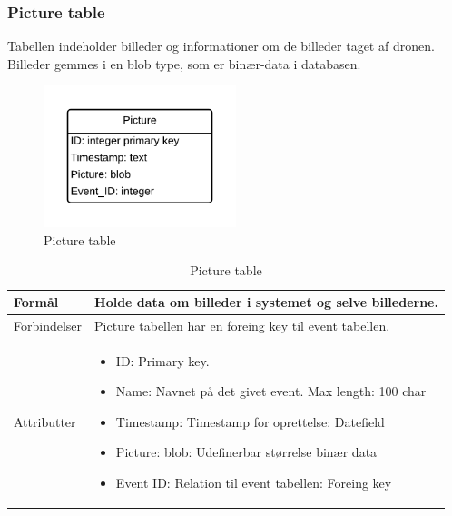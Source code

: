 \subsubsection*{Picture table}
Tabellen indeholder billeder og informationer om de billeder taget af dronen. Billeder gemmes i en blob type, som er binær-data i databasen.
\vspace{-5pt}
\begin{figure}[H]
	\centering
	\includegraphics[width=0.5\textwidth]{Billeder/database/PictureTable.png}
	\vspace{-5pt}
	\caption{Picture table}
	\label{fig:picture_table}
\end{figure}

\begin{table}[H]
\begin{tabular}{| p{3cm}| p{11.5cm}|}
\hline

Formål	 							& Holde data om billeder i systemet og selve billederne.\\\hline
Forbindelser						& Picture tabellen har en foreing key til event tabellen.\\\hline
Attributter						& \begin{itemize}
												\item ID: Primary key.
												\item Name: Navnet på det givet event. Max length: 100 char
												\item Timestamp: Timestamp for oprettelse: Datefield
												\item Picture: blob: Udefinerbar størrelse binær data
												\item Event ID: Relation til event tabellen: Foreing key
											\end{itemize} \\\hline 
\end{tabular}
\caption{Picture table}
\label{tab:picture_table}
\end{table}